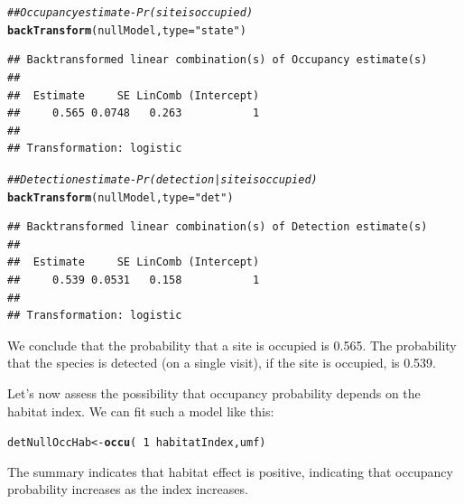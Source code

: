 \documentclass[12pt]{article}\usepackage[]{graphicx}\usepackage[]{color}
\makeatletter
\newcommand{\hlnum}[1]{\textcolor[rgb]{0.686,0.059,0.569}{#1}}%
\newcommand{\hlstr}[1]{\textcolor[rgb]{0.192,0.494,0.8}{#1}}%
\newcommand{\hlcom}[1]{\textcolor[rgb]{0.678,0.584,0.686}{\textit{#1}}}%
\newcommand{\hlopt}[1]{\textcolor[rgb]{0,0,0}{#1}}%
\newcommand{\hlstd}[1]{\textcolor[rgb]{0.345,0.345,0.345}{#1}}%
\newcommand{\hlkwb}[1]{\textcolor[rgb]{0.69,0.353,0.396}{#1}}%
\newcommand{\hlkwc}[1]{\textcolor[rgb]{0.333,0.667,0.333}{#1}}%
\newcommand{\hlkwd}[1]{\textcolor[rgb]{0.737,0.353,0.396}{\textbf{#1}}}%
\newenvironment{kframe}{%
 \def\at@end@of@kframe{}%
 \ifinner\ifhmode%
  \def\at@end@of@kframe{\end{minipage}}%
  \begin{minipage}{\columnwidth}%
 \fi\fi%
 \def\FrameCommand##1{\hskip\@totalleftmargin \hskip-\fboxsep
 \colorbox{shadecolor}{##1}\hskip-\fboxsep
     \hskip-\linewidth \hskip-\@totalleftmargin \hskip\columnwidth}%
 \MakeFramed {\advance\hsize-\width
   \@totalleftmargin\z@ \linewidth\hsize
   \@setminipage}}%
 {\par\unskip\endMakeFramed%
 \at@end@of@kframe}
\newenvironment{knitrout}{}{} %
\makeatother
\begin{document}
\begin{knitrout}
\color{fgcolor}\begin{kframe}
\begin{alltt}
\hlcom{## Occupancy estimate - Pr(site is occupied)}
\hlkwd{backTransform}\hlstd{(nullModel,} \hlkwc{type}\hlstd{=}\hlstr{"state"}\hlstd{)}
\end{alltt}
\begin{verbatim}
## Backtransformed linear combination(s) of Occupancy estimate(s)
## 
##  Estimate     SE LinComb (Intercept)
##     0.565 0.0748   0.263           1
## 
## Transformation: logistic
\end{verbatim}
\begin{alltt}
\hlcom{## Detection estimate - Pr(detection | site is occupied)}
\hlkwd{backTransform}\hlstd{(nullModel,} \hlkwc{type}\hlstd{=}\hlstr{"det"}\hlstd{)}
\end{alltt}
\begin{verbatim}
## Backtransformed linear combination(s) of Detection estimate(s)
## 
##  Estimate     SE LinComb (Intercept)
##     0.539 0.0531   0.158           1
## 
## Transformation: logistic
\end{verbatim}
\end{kframe}
\end{knitrout}

We conclude that the probability that a site is occupied is 0.565. The probability that the species is detected (on a single visit), if the site is occupied, is 0.539.

Let's now assess the possibility that occupancy probability depends on the habitat index. We can fit such a model like this:

\begin{knitrout}
\color{fgcolor}\begin{kframe}
\begin{alltt}
\hlstd{detNullOccHab} \hlkwb{<-} \hlkwd{occu}\hlstd{(}\hlopt{~}\hlnum{1} \hlopt{~}\hlstd{habitatIndex, umf)}
\end{alltt}
\end{kframe}
\end{knitrout}

The summary indicates that habitat effect is positive, indicating that occupancy probability increases as the index increases. 
\end{document}
